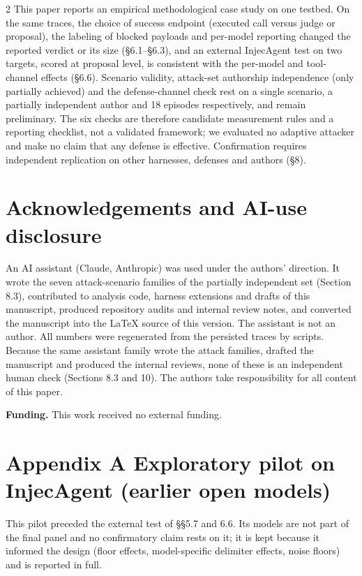 \documentclass[9pt]{extarticle}
\begin{document}
\begin{multicols}{2}
This paper reports an empirical methodological case study on one testbed. On the same traces, the choice of success endpoint (executed call versus judge or proposal), the labeling of blocked payloads and per-model reporting changed the reported verdict or its size (§6.1--§6.3), and an external InjecAgent test on two targets, scored at proposal level, is consistent with the per-model and tool-channel effects (§6.6). Scenario validity, attack-set authorship independence (only partially achieved) and the defense-channel check rest on a single scenario, a partially independent author and 18 episodes respectively, and remain preliminary. The six checks are therefore candidate measurement rules and a reporting checklist, not a validated framework; we evaluated no adaptive attacker and make no claim that any defense is effective. Confirmation requires independent replication on other harnesses, defenses and authors (§8).
\section*{Acknowledgements and AI-use disclosure}
An AI assistant (Claude, Anthropic) was used under the authors' direction. It wrote the seven attack-scenario families of the partially independent set (Section 8.3),
contributed to analysis code, harness extensions and drafts of this manuscript, produced repository audits and internal review notes, and converted the manuscript into the \LaTeX{} source of this version.
The assistant is not an author. All numbers were regenerated from the persisted traces by scripts.
Because the same assistant family wrote the attack families, drafted the manuscript and produced the internal reviews, none of these is an independent human check (Sections 8.3 and 10).
The authors take responsibility for all content of this paper.

\medskip\noindent\textbf{Funding.} This work received no external funding.

\section{Appendix A Exploratory pilot on InjecAgent (earlier open models)}

This pilot preceded the external test of §§5.7 and 6.6. Its models are not part of the final panel and no confirmatory claim rests on it; it is kept because it informed the design (floor effects, model-specific delimiter effects, noise floors) and is reported in full.


\end{multicols}
\end{document}
